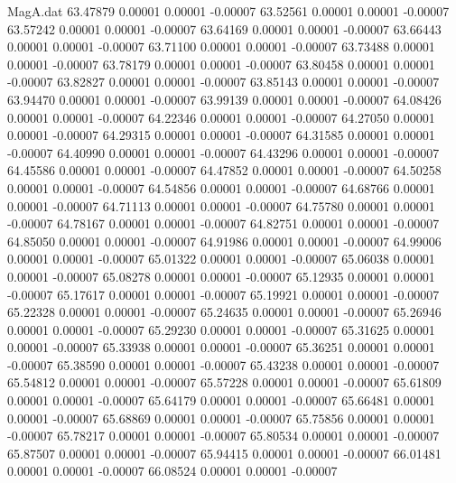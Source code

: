 \begin{filecontents}{MagA.dat}
  63.47879    0.00001    0.00001   -0.00007
  63.52561    0.00001    0.00001   -0.00007
  63.57242    0.00001    0.00001   -0.00007
  63.64169    0.00001    0.00001   -0.00007
  63.66443    0.00001    0.00001   -0.00007
  63.71100    0.00001    0.00001   -0.00007
  63.73488    0.00001    0.00001   -0.00007
  63.78179    0.00001    0.00001   -0.00007
  63.80458    0.00001    0.00001   -0.00007
  63.82827    0.00001    0.00001   -0.00007
  63.85143    0.00001    0.00001   -0.00007
  63.94470    0.00001    0.00001   -0.00007
  63.99139    0.00001    0.00001   -0.00007
  64.08426    0.00001    0.00001   -0.00007
  64.22346    0.00001    0.00001   -0.00007
  64.27050    0.00001    0.00001   -0.00007
  64.29315    0.00001    0.00001   -0.00007
  64.31585    0.00001    0.00001   -0.00007
  64.40990    0.00001    0.00001   -0.00007
  64.43296    0.00001    0.00001   -0.00007
  64.45586    0.00001    0.00001   -0.00007
  64.47852    0.00001    0.00001   -0.00007
  64.50258    0.00001    0.00001   -0.00007
  64.54856    0.00001    0.00001   -0.00007
  64.68766    0.00001    0.00001   -0.00007
  64.71113    0.00001    0.00001   -0.00007
  64.75780    0.00001    0.00001   -0.00007
  64.78167    0.00001    0.00001   -0.00007
  64.82751    0.00001    0.00001   -0.00007
  64.85050    0.00001    0.00001   -0.00007
  64.91986    0.00001    0.00001   -0.00007
  64.99006    0.00001    0.00001   -0.00007
  65.01322    0.00001    0.00001   -0.00007
  65.06038    0.00001    0.00001   -0.00007
  65.08278    0.00001    0.00001   -0.00007
  65.12935    0.00001    0.00001   -0.00007
  65.17617    0.00001    0.00001   -0.00007
  65.19921    0.00001    0.00001   -0.00007
  65.22328    0.00001    0.00001   -0.00007
  65.24635    0.00001    0.00001   -0.00007
  65.26946    0.00001    0.00001   -0.00007
  65.29230    0.00001    0.00001   -0.00007
  65.31625    0.00001    0.00001   -0.00007
  65.33938    0.00001    0.00001   -0.00007
  65.36251    0.00001    0.00001   -0.00007
  65.38590    0.00001    0.00001   -0.00007
  65.43238    0.00001    0.00001   -0.00007
  65.54812    0.00001    0.00001   -0.00007
  65.57228    0.00001    0.00001   -0.00007
  65.61809    0.00001    0.00001   -0.00007
  65.64179    0.00001    0.00001   -0.00007
  65.66481    0.00001    0.00001   -0.00007
  65.68869    0.00001    0.00001   -0.00007
  65.75856    0.00001    0.00001   -0.00007
  65.78217    0.00001    0.00001   -0.00007
  65.80534    0.00001    0.00001   -0.00007
  65.87507    0.00001    0.00001   -0.00007
  65.94415    0.00001    0.00001   -0.00007
  66.01481    0.00001    0.00001   -0.00007
  66.08524    0.00001    0.00001   -0.00007

\end{filecontents}
